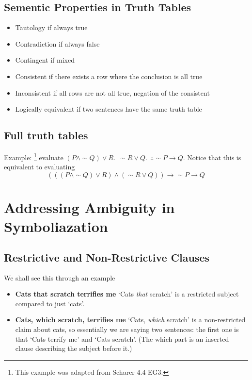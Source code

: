 \documentclass[10pt]{article}
\renewcommand{\implies}{\rightarrow}
\renewcommand{\neg}{\sim}
\begin{document}
\subsection{Sementic Properties in Truth Tables}
\begin{itemize}
    \item Tautology if always true
    \item Contradiction if always false 
    \item Contingent if mixed
    \item Consistent if there exists a row where the conclusion is all true
    \item Inconsistent if all rows are not all true, negation of the consistent
    \item Logically equivalent if two sentences have the same truth table
\end{itemize}



\subsection{Full truth tables}
Example: \footnote{This example was adapted from Scharer 4.4 EG3.}
evaluate $(P\land \neg Q)\vee R. ~~\neg R\vee Q. ~~\therefore \neg P\implies Q$. 
Notice that this is equivalent to evaluating
\begin{equation*}
    \left(\left(\left(P\land \neg Q\right)\vee R \right) \land 
    \left(\neg R\vee Q\right)\right) \implies \neg P\implies Q
\end{equation*}


\section{Addressing Ambiguity in Symboliazation}
\subsection{Restrictive and Non-Restrictive Clauses}
We shall see this through an example
\begin{itemize}
    \item \textbf{Cats that scratch terrifies me} `Cats \textit{that} scratch' 
    is a restricted subject compared to just `cats'.
    \item \textbf{Cats, which scratch, terrifies me} `Cats, \textit{which} scratch'
    is a non-restricted claim about cats, so essentially we are saying two sentences:
    the first one is that `Cats terrify me' and `Cats scratch'. (The which part 
    is an inserted clause describing the subject before it.)
\end{itemize}
\end{document}
